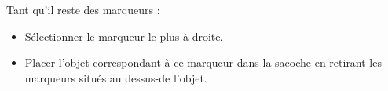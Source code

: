 Tant qu'il reste des marqueurs :
\begin{itemize}
  \item Sélectionner le marqueur le plus à droite.
  \item Placer l'objet correspondant à ce marqueur dans la sacoche en retirant les marqueurs situés au dessus-de l'objet.
\end{itemize}

